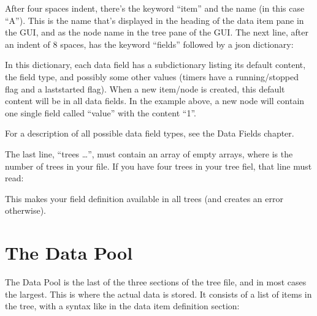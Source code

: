 \documentclass[letterpaper,10pt,english]{sphinxmanual}
\begin{document}
\sphinxAtStartPar
After four spaces indent, there’s the keyword “item” and the name (in this case “A”). This is the name that’s displayed in the heading of the data item pane in the GUI, and as the node name in the tree pane of the GUI.
The next line, after an indent of 8 spaces, has the keyword “fields” followed by a json dictionary:

\begin{sphinxVerbatim}[commandchars=\\\{\}]
      
\end{sphinxVerbatim}

\sphinxAtStartPar
In this dictionary, each data field has a sub\sphinxhyphen{}dictionary listing its default content, the field type, and possibly some other values (timers have a running/stopped flag and a last\sphinxhyphen{}started flag). When a new item/node is created, this default content will be in all data fields. In the example above, a new node will contain one single field called “value” with the content “1”.

\sphinxAtStartPar
For a description of all possible data field types, see the Data Fields chapter.

\sphinxAtStartPar
The last line, “trees …”, must contain an array of  empty arrays, where  is the number of trees in your file. If you have four trees in your tree fiel, that line must read:

\begin{sphinxVerbatim}[commandchars=\\\{\}]
 \PYG{p}{[}\PYG{p}{[}\PYG{p}{]} \PYG{p}{[}\PYG{p}{]} \PYG{p}{[}\PYG{p}{]} \PYG{p}{[}\PYG{p}{]}\PYG{p}{]}
\end{sphinxVerbatim}

\sphinxAtStartPar
This makes your field definition available in all trees (and creates an error otherwise).


\section{The Data Pool}
\label{\detokenize{data-format:the-data-pool}}
\sphinxAtStartPar
The Data Pool is the last of the three sections of the tree file, and in most cases the largest. This is where the actual data is stored.
It consists of a list of items in the tree, with a syntax like in the data item definition section:
\end{document}
